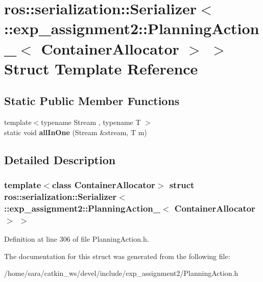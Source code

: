 \hypertarget{structros_1_1serialization_1_1Serializer_3_01_1_1exp__assignment2_1_1PlanningAction___3_01ContainerAllocator_01_4_01_4}{}\section{ros\+:\+:serialization\+:\+:Serializer$<$ \+:\+:exp\+\_\+assignment2\+:\+:Planning\+Action\+\_\+$<$ Container\+Allocator $>$ $>$ Struct Template Reference}
\label{structros_1_1serialization_1_1Serializer_3_01_1_1exp__assignment2_1_1PlanningAction___3_01ContainerAllocator_01_4_01_4}
\subsection*{Static Public Member Functions}
\begin{DoxyCompactItemize}
\item 
\mbox{\label{structros_1_1serialization_1_1Serializer_3_01_1_1exp__assignment2_1_1PlanningAction___3_01ContainerAllocator_01_4_01_4_a17ef770757943c31ddcdd00626374c8c}} 
{\footnotesize template$<$typename Stream , typename T $>$ }\\static void {\bfseries all\+In\+One} (Stream \&stream, T m)
\end{DoxyCompactItemize}


\subsection{Detailed Description}
\subsubsection*{template$<$class Container\+Allocator$>$\newline
struct ros\+::serialization\+::\+Serializer$<$ \+::exp\+\_\+assignment2\+::\+Planning\+Action\+\_\+$<$ Container\+Allocator $>$ $>$}



Definition at line 306 of file Planning\+Action.\+h.



The documentation for this struct was generated from the following file\+:\begin{DoxyCompactItemize}
\item 
/home/sara/catkin\+\_\+ws/devel/include/exp\+\_\+assignment2/Planning\+Action.\+h\end{DoxyCompactItemize}
